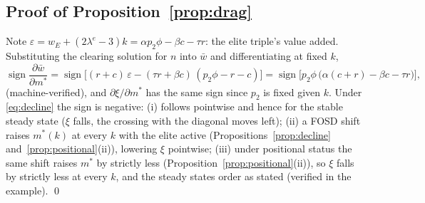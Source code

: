 \documentclass[12pt,letterpaper]{article}
\theoremstyle{definition}
\begin{document}
\subsection{Proof of Proposition~\ref{prop:drag}} Note $\varepsilon = w_E+(2\lambda^{e}-3)k = \alpha p_2\phi-\beta c-\tau r$: the elite triple's value added.
Substituting the clearing solution for $n$ into $\bar{w}$ and differentiating at fixed $k$, \[ \operatorname{sign}\frac{\partial \bar{w}}{\partial m^\ast} = \operatorname{sign}\Big[(r+c)\,\varepsilon - (\tau r+\beta c)\,(p_2\phi-r-c)\Big] = \operatorname{sign}\Big[p_2\phi\,\big(\alpha(c+r)-\beta c-\tau r\big)\Big], \] (machine-verified), and $\partial \xi/\partial m^\ast$ has the same sign since $p_2$ is fixed given $k$.
Under \eqref{eq:decline} the sign is negative: (i) follows pointwise and hence for the stable steady state ($\xi$ falls, the crossing with the diagonal moves left); (ii) a FOSD shift raises $m^\ast(k)$ at every $k$ with the elite active (Propositions~\ref{prop:decline} and~\ref{prop:positional}(ii)), lowering $\xi$ pointwise; (iii) under positional status the same shift raises $m^\ast$ by strictly less (Proposition~\ref{prop:positional}(ii)), so $\xi$ falls by strictly less at every $k$, and the steady states order as stated (verified in the example).
\qed
\end{document}
